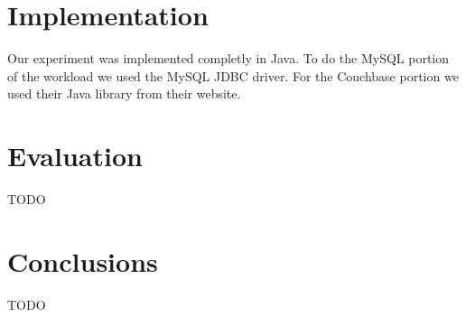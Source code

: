 \documentclass[]{IEEEtran}
\begin{document}
\section{Implementation}
Our experiment was implemented completly in Java. To do the MySQL portion of the workload we used
the MySQL JDBC driver. For the Couchbase portion we used their Java library from their website.

\section{Evaluation}
TODO

\section{Conclusions}
TODO

% 
% 
\end{document}
